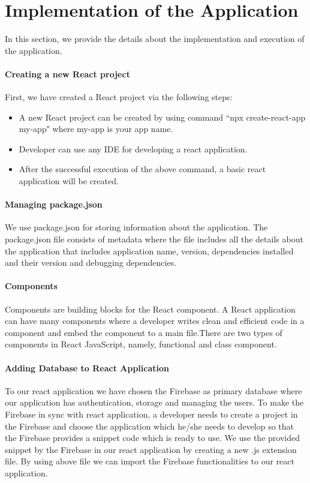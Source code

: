 \section{Implementation of the Application} In this section, we provide the details about the implementation and execution of the application.

\paragraph{\textbf{Creating a new React project}} First, we have created a React project via the following steps:
\begin{itemize}
	\item A new React project can be created by using command
	``npx create-react-app my-app" where my-app is your app name.
	\item Developer can use any IDE for developing a react application.
	\item After the successful execution of the above command, a basic react application will be created.
\end{itemize}

\paragraph{\textbf{Managing package.json}} We use package.json for storing information about the application. The package.json file consists of metadata where the file includes all the details about the application that includes application name, version, dependencies installed and their version and debugging dependencies.

\paragraph{\textbf{Components}} Components are building blocks for the React component. A React application can have many components where a developer writes clean and efficient code in a component and embed the component to a main file.There are two types of components in React JavaScript, namely, functional and class component.

\paragraph{\textbf{Adding Database to React Application}} To our react application we have chosen the Firebase as primary database where our application has authentication, storage and managing the users. To make the Firebase in sync with react application, a developer needs to create a project in the Firebase and choose the application which he/she needs to develop so that the Firebase provides a snippet code which is ready to use. We use the provided snippet by the Firebase in our react application by creating a new .js extension file. By using above file we can import the Firebase functionalities to our react application.

